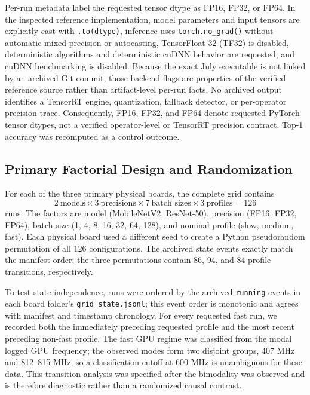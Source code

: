 \documentclass[electronics,article,submit,pdftex,moreauthors]{Definitions/mdpi}
\newcommand{\mobile}{MobileNetV2}
\newcommand{\resnet}{ResNet-50}
\begin{document}
Per-run metadata label the requested tensor dtype as FP16, FP32, or FP64. In the inspected reference implementation, model parameters and input tensors are explicitly cast with \texttt{.to(dtype)}, inference uses \texttt{torch.no\_grad()} without automatic mixed precision or autocasting, TensorFloat-32 (TF32) is disabled, deterministic algorithms and deterministic cuDNN behavior are requested, and cuDNN benchmarking is disabled. Because the exact July executable is not linked by an archived Git commit, those backend flags are properties of the verified reference source rather than artifact-level per-run facts. No archived output identifies a TensorRT engine, quantization, fallback detector, or per-operator precision trace. Consequently, FP16, FP32, and FP64 denote requested PyTorch tensor dtypes, not a verified operator-level or TensorRT precision contract. Top-1 accuracy was recomputed as a control outcome.

\subsection{Primary Factorial Design and Randomization}

For each of the three primary physical boards, the complete grid contains
\begin{equation}
2\ \text{models}\times3\ \text{precisions}\times7\ \text{batch sizes}\times3\ \text{profiles}=126
\end{equation}
runs. The factors are model (\mobile{}, \resnet{}), precision (FP16, FP32, FP64), batch size (1, 4, 8, 16, 32, 64, 128), and nominal profile (slow, medium, fast). Each physical board used a different seed to create a Python pseudorandom permutation of all 126 configurations. The archived state events exactly match the manifest order; the three permutations contain 86, 94, and 84 profile transitions, respectively.

To test state independence, runs were ordered by the archived \texttt{running} events in each board folder's \texttt{grid\_state.jsonl}; this event order is monotonic and agrees with manifest and timestamp chronology. For every requested fast run, we recorded both the immediately preceding requested profile and the most recent preceding non-fast profile. The fast GPU regime was classified from the modal logged GPU frequency; the observed modes form two disjoint groups, 407 MHz and 812--815 MHz, so a classification cutoff at 600 MHz is unambiguous for these data. This transition analysis was specified after the bimodality was observed and is therefore diagnostic rather than a randomized causal contrast.
\end{document}
